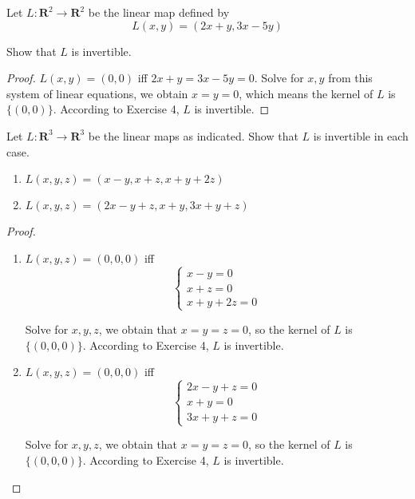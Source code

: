 \begin{exercise}
    Let $L: \mathbf{R}^{2} \to \mathbf{R}^{2}$ be the linear map defined by
    \[
        L(x, y) = (2x + y, 3x - 5y)
    \]

    Show that $L$ is invertible.
\end{exercise}

\begin{proof}
    $L(x, y) = (0, 0)$ iff $2x + y = 3x - 5y = 0$. Solve for $x, y$ from this system of linear equations, we obtain $x = y = 0$, which means the kernel of $L$ is $\{ (0, 0) \}$. According to Exercise 4, $L$ is invertible.
\end{proof}

\begin{exercise}
    Let $L: \mathbf{R}^{3} \to \mathbf{R}^{3}$ be the linear maps as indicated. Show that $L$ is invertible in each case.
    \begin{enumerate}[label={(\alph*)}]
        \item $L(x, y, z) = (x - y, x + z, x + y + 2z)$
        \item $L(x, y, z) = (2x - y + z, x + y, 3x + y + z)$
    \end{enumerate}
\end{exercise}

\begin{proof}
    \begin{enumerate}[label={(\alph*)}]
        \item $L(x, y, z) = (0, 0, 0)$ iff
              \[
                  \begin{cases}
                      x - y = 0 \\
                      x + z = 0 \\
                      x + y + 2z = 0
                  \end{cases}
              \]

              Solve for $x, y, z$, we obtain that $x = y = z = 0$, so the kernel of $L$ is $\{ (0, 0, 0) \}$. According to Exercise 4, $L$ is invertible.
        \item $L(x, y, z) = (0, 0, 0)$ iff
              \[
                  \begin{cases}
                      2x - y + z = 0 \\
                      x + y = 0      \\
                      3x + y + z = 0
                  \end{cases}
              \]

              Solve for $x, y, z$, we obtain that $x = y = z = 0$, so the kernel of $L$ is $\{ (0, 0, 0) \}$. According to Exercise 4, $L$ is invertible.
    \end{enumerate}
\end{proof}

